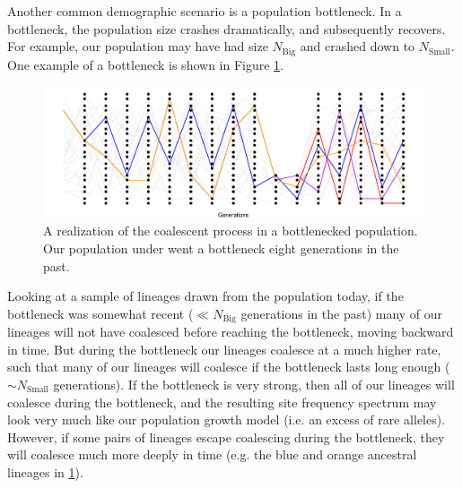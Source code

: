 Another common demographic scenario is a population bottleneck. In a bottleneck, the population size crashes dramatically, and subsequently
recovers. For example, our population may have had size $N_{\textrm{Big}}$
and crashed down to $N_{\textrm{Small}}$. One example of a
bottleneck is shown in Figure \ref{fig:Genealogy_crash}. 
\begin{figure}
\begin{center}
  \includegraphics[width = \textwidth]{figures/Genetic_drift/Demography/Crash_genealogy.pdf}
\end{center}
\caption{A realization of the coalescent process in a bottlenecked population. Our population under went a bottleneck eight generations in the past.  } \label{fig:Genealogy_crash}
\end{figure}
Looking at a sample of lineages drawn from the population today, if
the bottleneck was somewhat recent ($\ll N_{\textrm{Big}}$ generations
in the past) many of our lineages will not have coalesced before reaching
the bottleneck, moving backward in time. But during the bottleneck our
lineages coalesce at a much higher rate, such that many of our
lineages will coalesce if the bottleneck lasts long enough
($\sim N_{\textrm{Small}}$ generations). If the bottleneck is very
strong, then all of our lineages will coalesce during the bottleneck, and the resulting site frequency spectrum may
look very much like our population growth model (i.e. an excess of rare
alleles). However, if some pairs of lineages escape coalescing during
the bottleneck, they will coalesce much more deeply in time (e.g. the
blue and orange ancestral lineages in
\ref{fig:Genealogy_crash}). 
